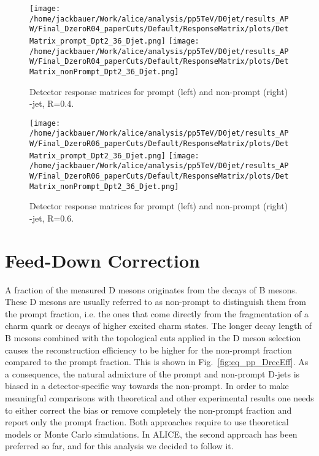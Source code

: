 \begin{figure}[bth]
\centering
\texttt{[image: /home/jackbauer/Work/alice/analysis/pp5TeV/D0jet/results\_APW/Final\_DzeroR04\_paperCuts/Default/ResponseMatrix/plots/DetMatrix\_prompt\_Dpt2\_36\_Djet.png]}
\texttt{[image: /home/jackbauer/Work/alice/analysis/pp5TeV/D0jet/results\_APW/Final\_DzeroR04\_paperCuts/Default/ResponseMatrix/plots/DetMatrix\_nonPrompt\_Dpt2\_36\_Djet.png]}
\caption{Detector response matrices for prompt (left) and non-prompt (right) \Dzero-jet, R=0.4.}
\label{fig:fRMdet_pp_DzeroR04}
\end{figure}

\begin{figure}[bth]
\centering
\texttt{[image: /home/jackbauer/Work/alice/analysis/pp5TeV/D0jet/results\_APW/Final\_DzeroR06\_paperCuts/Default/ResponseMatrix/plots/DetMatrix\_prompt\_Dpt2\_36\_Djet.png]}
\texttt{[image: /home/jackbauer/Work/alice/analysis/pp5TeV/D0jet/results\_APW/Final\_DzeroR06\_paperCuts/Default/ResponseMatrix/plots/DetMatrix\_nonPrompt\_Dpt2\_36\_Djet.png]}
\caption{Detector response matrices for prompt (left) and non-prompt (right) \Dzero-jet, R=0.6.}
\label{fig:fRMdet_pp_DzeroR06}
\end{figure}



\section{Feed-Down Correction}
\label{sec:FD}

A fraction of the measured D mesons originates from the decays of B mesons. These D mesons are usually referred to as non-prompt to distinguish them from the prompt fraction, i.e. the ones that come directly from the fragmentation of a charm quark or decays of higher excited charm states.
The longer decay length of B mesons combined with the topological cuts applied in the D meson selection causes the reconstruction efficiency to be higher for the non-prompt fraction compared to the prompt fraction. This is shown in Fig.~\ref{fig:eq_pp_DrecEff}.
As a consequence, the natural admixture of the prompt and non-prompt D-jets is biased in a detector-specific way towards the non-prompt.
In order to make meaningful comparisons with theoretical and other experimental results one needs to either correct the bias or remove completely the non-prompt fraction and report only the prompt fraction. 
Both approaches require to use theoretical models or Monte Carlo simulations.
In ALICE, the second approach has been preferred so far, and for this analysis we decided to follow it.

